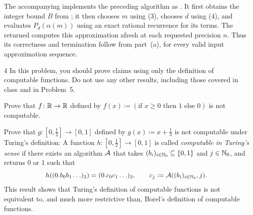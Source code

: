 \documentclass[11pt, oneside]{article}
\begin{document}
\begin{solution}
\begin{problemsubparts}
    \item The accompanying  implements the preceding
    algorithm as . It first obtains the integer
    bound $B$ from ; it then chooses $m$ using (3),
    chooses $d$ using (4), and evaluates $P_d(\alpha(m))$ using an exact
    rational recurrence for its terms. The returned 
    computes this approximation afresh at each requested precision $n$.
    Thus its correctness and termination follow from part~(a),
    for every valid input approximation sequence.
\end{problemsubparts}
\end{solution}

\begin{problem}{4}
In this problem, you should prove claims using only the definition of
computable functions. Do not use any other results, including those
covered in class and in Problem~5.
\begin{problemsubparts}
    \item Prove that $f\colon\mathbb{R}\to\mathbb{R}$ defined by
    $f(x)\coloneqq(\text{if }x\ge0\text{ then }1\text{ else }0)$
    is not computable.
    \item Prove that $g\colon[0, \tfrac12]\to[0, 1]$ defined by
    $g(x)\coloneqq x+\tfrac13$ is not computable under Turing's definition:
    A function $h\colon[0, \tfrac12]\to[0, 1]$ is called
    \emph{computable in Turing's sense} if there exists an algorithm
    $\mathcal{A}$ that takes $(b_i)_{i\in\mathbb{N}_0}\subseteq\{0, 1\}$ and
    $j\in\mathbb{N}_0$, and returns $0$ or $1$ such that
    \[
       h((0.b_0b_1\ldots)_2)=(0.c_0c_1\ldots)_2,
       \qquad c_j\coloneqq\mathcal{A}((b_i)_{i\in\mathbb{N}_0}, j).
    \]
    This result shows that Turing's definition of computable functions
    is not equivalent to, and much more restrictive than, Borel's
    definition of computable functions.
\end{problemsubparts}
\end{problem}
\end{document}
